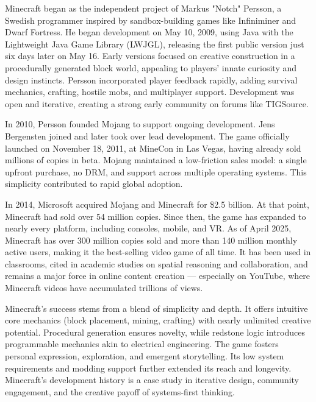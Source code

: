 \begin{historical}
Minecraft began as the independent project of Markus "Notch" Persson, a Swedish programmer inspired by sandbox-building games like Infiniminer and Dwarf Fortress. He began development on May 10, 2009, using Java with the Lightweight Java Game Library (LWJGL), releasing the first public version just six days later on May 16. Early versions focused on creative construction in a procedurally generated block world, appealing to players' innate curiosity and design instincts. Persson incorporated player feedback rapidly, adding survival mechanics, crafting, hostile mobs, and multiplayer support. Development was open and iterative, creating a strong early community on forums like TIGSource.

In 2010, Persson founded Mojang to support ongoing development. Jens Bergensten joined and later took over lead development. The game officially launched on November 18, 2011, at MineCon in Las Vegas, having already sold millions of copies in beta. Mojang maintained a low-friction sales model: a single upfront purchase, no DRM, and support across multiple operating systems. This simplicity contributed to rapid global adoption.

In 2014, Microsoft acquired Mojang and Minecraft for \$2.5 billion. At that point, Minecraft had sold over 54 million copies. Since then, the game has expanded to nearly every platform, including consoles, mobile, and VR. As of April 2025, Minecraft has over 300 million copies sold and more than 140 million monthly active users, making it the best-selling video game of all time. It has been used in classrooms, cited in academic studies on spatial reasoning and collaboration, and remains a major force in online content creation — especially on YouTube, where Minecraft videos have accumulated trillions of views.

Minecraft’s success stems from a blend of simplicity and depth. It offers intuitive core mechanics (block placement, mining, crafting) with nearly unlimited creative potential. Procedural generation ensures novelty, while redstone logic introduces programmable mechanics akin to electrical engineering. The game fosters personal expression, exploration, and emergent storytelling. Its low system requirements and modding support further extended its reach and longevity. Minecraft’s development history is a case study in iterative design, community engagement, and the creative payoff of systems-first thinking.
\end{historical}